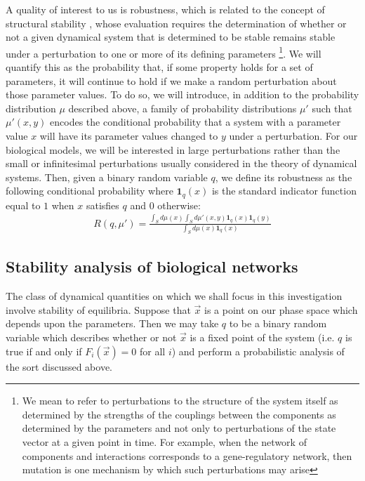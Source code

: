A quality of interest to us is robustness, which is related to the concept of structural stability \cite{Smale1967}, whose evaluation requires the determination of whether or not a given dynamical system that is determined to be stable remains stable under a perturbation to one or more of its defining parameters \footnote{We mean to refer to perturbations to the structure of the system itself as determined by the strengths of the couplings between the components as determined by the parameters and not only to perturbations of the state vector at a given point in time. For example, when the network of components and interactions corresponds to a gene-regulatory network, then mutation is one mechanism by which such perturbations may arise}.  We will quantify this as the probability that, if some property holds for a set of parameters, it will continue to hold if we make a random perturbation about those parameter values. To do so, we will introduce, in addition to the probability distribution $\mu$ described above, a family of probability distributions $\mu'$ such that $\mu'(x,y)$ encodes the conditional probability that a system with a parameter value $x$ will have its parameter values changed to $y$ under a perturbation.  For our biological models, we will be interested in large perturbations rather than the small or infinitesimal perturbations usually considered in the theory of dynamical systems.  Then, given a binary random variable $q$, we define its robustness as the following conditional probability where $\mathbf{1}_q(x)$ is the standard indicator function equal to $1$ when $x$ satisfies $q$ and $0$ otherwise:
\begin{align}\label{eq:robustness}
  R (q,\mu') =
  \frac{\int_S d\mu(x) \int_S d\mu'(x,y) \mathbf{1}_q(x) \mathbf{1}_q(y)}
  {\int_S d\mu(x) \mathbf{1}_q(x)}
\end{align}

\subsection{Stability analysis of biological networks}
The class of dynamical quantities on which we shall focus in this
investigation involve stability of equilibria.  Suppose that $\vec x$
is a point on our phase space which depends upon the parameters.  Then
we may take $q$ to be a binary random variable which describes whether
or not $\vec x$ is a fixed point of the system (i.e. $q$ is true if and only if
$F_i(\vec{x})=0$ for all $i$) and perform a probabilistic analysis
of the sort discussed above.

